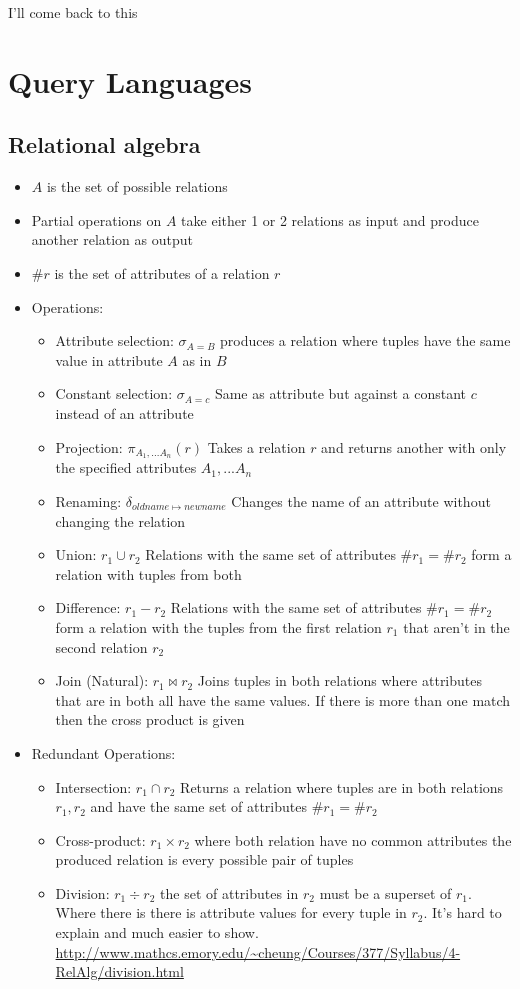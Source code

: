 \documentclass[10pt,a4paper]{article}
\begin{document}
		I'll come back to this

\section{Query Languages}
	\subsection{Relational algebra}
		\begin{itemize}
			\item $A$ is the set of possible relations
			\item Partial operations on $A$ take either 1 or 2 relations as input and produce another relation as output
			\item $\#r$ is the set of attributes of a relation $r$
			\item Operations:
			\begin{itemize}
				\item Attribute selection: $\sigma_{A=B}$ produces a relation where tuples have the same value in attribute $A$ as in $B$
				\item Constant selection: $\sigma_{A=c}$ Same as attribute but against a constant $c$ instead of an attribute
				\item Projection: $\pi_{A_1,...A_n}(r)$ Takes a relation $r$ and returns another with only the specified attributes $A_1,...A_n$
				\item Renaming: $\delta_{oldname\mapsto newname}$ Changes the name of an attribute without changing the relation
				\item Union: $r_1\cup r_2$ Relations with the same set of attributes $\#r_1 = \#r_2$ form a relation with tuples from both
				\item Difference: $r_1 - r_2$ Relations with the same set of attributes $\#r_1 = \#r_2$ form a relation with the tuples from the first relation $r_1$ that aren't in the second relation $r_2$
				\item Join (Natural): $r_1 \bowtie r_2$ Joins tuples in both relations where attributes that are in both all have the same values. If there is more than one match then the cross product is given
			\end{itemize}
			\item Redundant Operations:
			\begin{itemize}
				\item Intersection: $r_1\cap r_2$ Returns a relation where tuples are in both relations $r_1, r_2$ and have the same set of attributes $\#r_1 = \#r_2$
				\item Cross-product: $r_1\times r_2$ where both relation have no common attributes the produced relation is every possible pair of tuples
				\item Division: $r_1\div r_2$ the set of attributes in $r_2$ must be a superset of $r_1$. Where there is there is attribute values for every tuple in $r_2$. It's hard to explain and much easier to show. \url{http://www.mathcs.emory.edu/~cheung/Courses/377/Syllabus/4-RelAlg/division.html}
			\end{itemize}
		\end{itemize}
\end{document}
